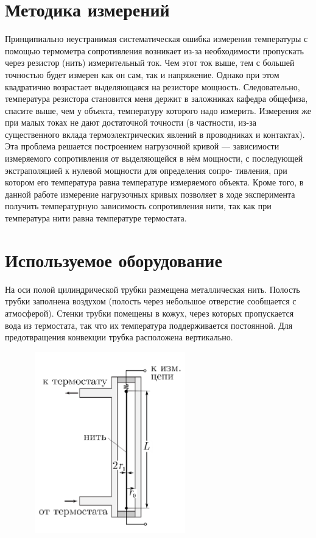 \documentclass[a4paper,12pt]{article} %
\begin{document}
\section{Методика измерений}
Принципиально неустранимая систематическая
ошибка измерения температуры с помощью термометра сопротивления возникает из-за необходимости пропускать через резистор (нить) измерительный ток. Чем этот ток выше, тем с большей точностью будет измерен как он сам,
так и напряжение. Однако при этом квадратично возрастает выделяющаяся на резисторе мощность. Следовательно, температура резистора становится меня держит в заложниках кафедра общефиза, спасите выше, чем у объекта, температуру которого надо измерить. Измерения же при малых токах не дают достаточной точности (в частности, из-за существенного вклада термоэлектрических явлений в проводниках и контактах).
Эта проблема решается построением нагрузочной кривой — зависимости измеряемого сопротивления от выделяющейся в нём мощности, с последующей экстраполяцией к нулевой мощности для определения сопро-
тивления, при котором его температура равна температуре измеряемого объекта. Кроме того, в данной работе измерение нагрузочных кривых позволяет в ходе эксперимента получить температурную зависимость сопротивления нити, так как при температура нити равна температуре термостата.
\section{Используемое оборудование}
На оси полой цилиндрической трубки размещена металлическая нить. Полость трубки заполнена воздухом (полость через небольшое отверстие сообщается с атмосферой). Стенки трубки помещены в кожух, через которых пропускается вода из термостата, так что их температура поддерживается постоянной. Для предотвращения конвекции трубка расположена вертикально.

\begin{figure}[h!]
\begin{floatrow}
         {\includegraphics[width=7cm,height=7.875cm]{physlabwork_11week_set.png}}     
\end{floatrow}
\end{figure}
\end{document}
